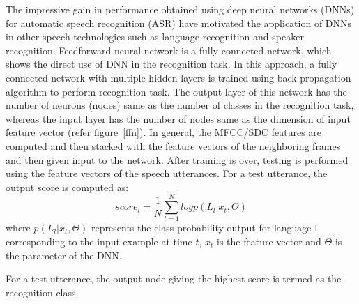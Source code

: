 \begin{spacing}{1.5}
The impressive gain in performance obtained using deep neural networks (DNNs) for automatic speech recognition (ASR) have motivated the application of DNNs in other speech technologies such as language recognition and speaker recognition. Feedforward neural network is a fully connected network, which shows the direct use of DNN in the recognition task. In this approach, a fully connected network with multiple hidden layers is trained using back-propagation algorithm to perform recognition task. The output layer of this network has the number of neurons (nodes) same as the number of classes in the recognition task, whereas the input layer has the number of nodes same as the dimension of input feature vector (refer figure~\ref{ffn}). In general, the MFCC/SDC features are computed and then stacked with the feature vectors of the neighboring frames and then given input to the network.  After training is over, testing is performed using the feature vectors of the speech utterances.  For a test utterance, the output score is computed as:
\begin{equation}
    score_{l}=\frac{1}{N}\sum_{t=1}^{N}log p(L_{l}|x_{t},\Theta)
\end{equation}
where $p(L_{l}|x_{t},\Theta)$ represents the class probability output for language l corresponding to the input example at time $t$, $x_{t}$ is the feature vector and $\Theta$ is the parameter of the DNN.

For a test utterance, the output node giving the highest score is termed as the recognition class.  






\end{spacing}
